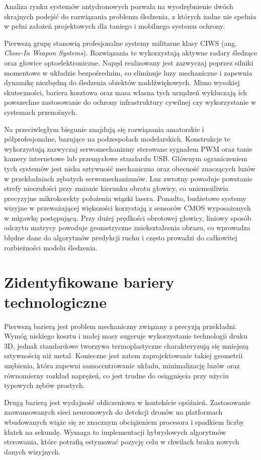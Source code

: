 \documentclass[a4paper,twoside,12pt]{book}
\begin{document}
Analiza rynku systemów antydronowych pozwala na wyodrębnienie dwóch skrajnych podejść do rozwiązania problemu śledzenia, z których żadne nie spełnia w pełni założeń projektowych dla taniego i mobilnego systemu ochrony.

Pierwszą grupę stanowią profesjonalne systemy militarne klasy CIWS (ang. \textit{Close-In Weapon Systems}). Rozwiązania te wykorzystują aktywne radary śledzące oraz głowice optoelektroniczne. Napęd realizowany jest zazwyczaj poprzez silniki momentowe w układzie bezpośrednim, co eliminuje luzy mechaniczne i zapewnia dynamikę niezbędną do śledzenia obiektów naddźwiękowych. Mimo wysokiej skuteczności, bariera kosztowa oraz masa własna tych urządzeń wykluczają ich powszechne zastosowanie do ochrony infrastruktury cywilnej czy wykorzystanie w systemach przenośnych.

Na przeciwległym biegunie znajdują się rozwiązania amatorskie i półprofesjonalne, bazujące na podzespołach modelarskich. Konstrukcje te wykorzystują zazwyczaj serwomechanizmy sterowane sygnałem PWM oraz tanie kamery internetowe lub przemysłowe standardu USB. Głównym ograniczeniem tych systemów jest niska sztywność mechaniczna oraz obecność znaczących luzów w przekładniach zębatych serwomechanizmów. Luz zwrotny powoduje powstanie strefy nieczułości przy zmianie kierunku obrotu głowicy, co uniemożliwia precyzyjne mikrokorekty położenia wiązki lasera. Ponadto, budżetowe systemy wizyjne w przeważającej większości korzystają z sensorów CMOS wyposażonych w migawkę postępującą. Przy dużej prędkości obrotowej głowicy, liniowy sposób odczytu matrycy powoduje geometryczne zniekształcenia obrazu, co wprowadza błędne dane do algorytmów predykcji ruchu i często prowadzi do całkowitej rozbieżności modelu śledzenia.

\section{Zidentyfikowane bariery technologiczne}

Pierwszą barierą jest problem mechaniczny związany z precyzją przekładni. Wymóg niskiego kosztu i małej masy sugeruje wykorzystanie technologii druku 3D, jednak standardowe tworzywa termoplastyczne charakteryzują się mniejszą sztywnością niż metal. Konieczne jest zatem zaprojektowanie takiej geometrii uzębienia, która zapewni samocentrowanie układu, minimalizację luzów oraz równomierny rozkład naprężeń, co jest trudne do osiągnięcia przy użyciu typowych zębów prostych.

Drugą barierą jest wydajność obliczeniowa w kontekście opóźnień. Zastosowanie zaawansowanych sieci neuronowych do detekcji dronów na platformach wbudowanych wiąże się ze znacznym obciążeniem procesora i spadkiem liczby klatek na sekundę. Wymaga to implementacji hybrydowych algorytmów sterowania, które potrafią estymować pozycję celu w chwilach braku nowych danych wizyjnych.
\end{document}
